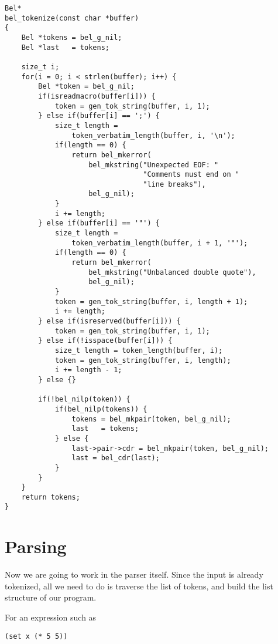 \documentclass[openright,a4paper,twoside,12pt]{memoir}
\begin{document}
\begin{verbatim}
Bel*
bel_tokenize(const char *buffer)
{
    Bel *tokens = bel_g_nil;
    Bel *last   = tokens;
    
    size_t i;
    for(i = 0; i < strlen(buffer); i++) {
        Bel *token = bel_g_nil;
        if(isreadmacro(buffer[i])) {
            token = gen_tok_string(buffer, i, 1);
        } else if(buffer[i] == ';') {
            size_t length =
                token_verbatim_length(buffer, i, '\n');
            if(length == 0) {
                return bel_mkerror(
                    bel_mkstring("Unexpected EOF: "
                                 "Comments must end on "
                                 "line breaks"),
                    bel_g_nil);
            }
            i += length;
        } else if(buffer[i] == '"') {
            size_t length =
                token_verbatim_length(buffer, i + 1, '"');
            if(length == 0) {
                return bel_mkerror(
                    bel_mkstring("Unbalanced double quote"),
                    bel_g_nil);
            }
            token = gen_tok_string(buffer, i, length + 1);
            i += length;
        } else if(isreserved(buffer[i])) {
            token = gen_tok_string(buffer, i, 1);
        } else if(!isspace(buffer[i])) {
            size_t length = token_length(buffer, i);
            token = gen_tok_string(buffer, i, length);
            i += length - 1;
        } else {}

        if(!bel_nilp(token)) {
            if(bel_nilp(tokens)) {
                tokens = bel_mkpair(token, bel_g_nil);
                last   = tokens;
            } else {
                last->pair->cdr = bel_mkpair(token, bel_g_nil);
                last = bel_cdr(last);
            }
        }
    }
    return tokens;
}
\end{verbatim}

\section{Parsing}
\label{sec:org9420fe2}

Now we  are going  to work in  the parser itself.  Since the  input is
already tokenized, all  we need to do is traverse  the list of tokens,
and build the list structure of our program.

For an expression such as

\begin{verbatim}
(set x (* 5 5))
\end{verbatim}
\end{document}
